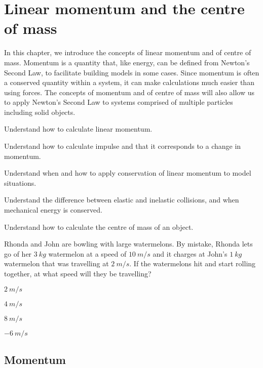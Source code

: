 
\chapter{Linear momentum and the centre of mass}
\label{chapter:momentumandcm}
In this chapter, we introduce the concepts of linear momentum and of centre of mass. Momentum is a quantity that, like energy, can be defined from Newton's Second Law, to facilitate building models in some cases. Since momentum is often a conserved quantity within a system, it can make calculations much easier than using forces. The concepts of momentum and of centre of mass will also allow us to apply Newton's Second Law to systems comprised of multiple particles including solid objects. 

\begin{learningObjectives}{
 \item Understand how to calculate linear momentum.
 \item Understand how to calculate impulse and that it corresponds to a change in momentum.
 \item Understand when and how to apply conservation of linear momentum to model situations.
 \item Understand the difference between elastic and inelastic collisions, and when mechanical energy is conserved.
 \item Understand how to calculate the centre of mass of an object.
}
\end{learningObjectives}

\begin{opening}
\begin{MCquestion}{Rhonda and John are bowling with large watermelons. By mistake, Rhonda lets go of her $\SI{3}{kg}$ watermelon at a speed of $\SI{10}{m/s}$ and it charges at John's $\SI{1}{kg}$ watermelon that was travelling at $\SI{2}{m/s}$. If the watermelons hit and start rolling together, at what speed will they be travelling?}
\item $\SI{2}{m/s}$
\item $\SI{4}{m/s}$
\item $\SI{8}{m/s}$ %
\item $\SI{-6}{m/s}$
\end{MCquestion}
\end{opening}


\section{Momentum}
